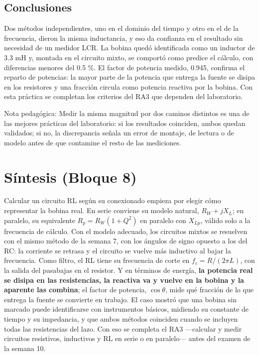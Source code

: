 \documentclass[11pt,letterpaper]{article}
\begin{document}
\subsection{Conclusiones}

Dos métodos independientes, uno en el dominio del tiempo y otro en el de la frecuencia, dieron la misma inductancia, y eso da confianza en el resultado sin necesidad de un medidor LCR. La bobina quedó identificada como un inductor de 3.3 mH y, montada en el circuito mixto, se comportó como predice el cálculo, con diferencias menores del 0.5 \%. El factor de potencia medido, 0.945, confirma el reparto de potencias: la mayor parte de la potencia que entrega la fuente se disipa en los resistores y una fracción circula como potencia reactiva por la bobina. Con esta práctica se completan los criterios del RA3 que dependen del laboratorio.

\begin{nota}{Nota pedagógica:}
Medir la misma magnitud por dos caminos distintos es una de las mejores prácticas del laboratorio: si los resultados coinciden, ambos quedan validados; si no, la discrepancia señala un error de montaje, de lectura o de modelo antes de que contamine el resto de las mediciones.
\end{nota}

\section{Síntesis (Bloque 8)}

Calcular un circuito RL según su conexionado empieza por elegir cómo representar la bobina real. En serie conviene su modelo natural, $R_W + jX_L$; en paralelo, su equivalente $R_p = R_W(1 + Q^2)$ en paralelo con $X_{Lp}$, válido solo a la frecuencia de cálculo. Con el modelo adecuado, los circuitos mixtos se resuelven con el mismo método de la semana 7, con los ángulos de signo opuesto a los del RC: la corriente se retrasa y el circuito se vuelve más inductivo al bajar la frecuencia. Como filtro, el RL tiene su frecuencia de corte en $f_c = R/(2\pi L)$, con la salida del pasabajas en el resistor. Y en términos de energía, \textbf{la potencia real se disipa en las resistencias, la reactiva va y vuelve en la bobina y la aparente las combina}; el factor de potencia, $\cos\theta$, mide qué fracción de lo que entrega la fuente se convierte en trabajo. El caso mostró que una bobina sin marcado puede identificarse con instrumentos básicos, midiendo su constante de tiempo y su impedancia, y que ambos métodos coinciden cuando se incluyen todas las resistencias del lazo. Con eso se completa el RA3 ---calcular y medir circuitos resistivos, inductivos y RL en serie o en paralelo--- antes del examen de la semana 10.
\end{document}
